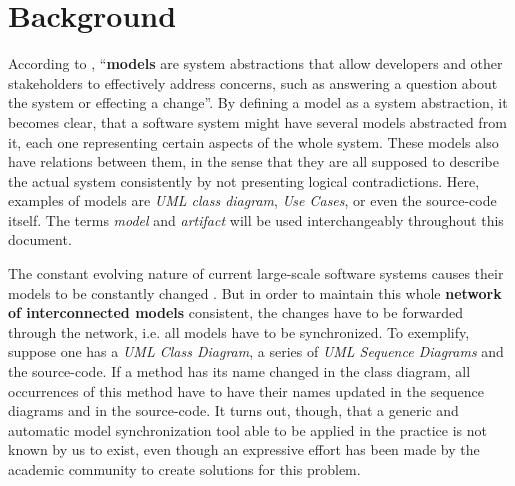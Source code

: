 \documentclass[tuberlin,cic,tc,english,noabntcite, oneside]{iiufrgs}
\begin{document}
\section{Background}
According to \citet[p. 21]{czarnecki2006feature}, \enquote{\textbf{models} are system abstractions that allow developers and other stakeholders to effectively address concerns, such as answering a question about the system or effecting a change}. By defining a model as a system abstraction, it becomes clear, that a software system might have several models abstracted from it, each one representing certain aspects of the whole system. These models also have relations between them, in the sense that they are all supposed to describe the actual system consistently by not presenting logical contradictions. Here, examples of models are \emph{UML class diagram}, \emph{Use Cases}, or even the source-code itself. The terms \emph{model} and \emph{artifact} will be used interchangeably throughout this document.

The constant evolving nature of current large-scale software systems causes their models to be constantly changed \citep{diskin2011model}. But in order to maintain this whole \textbf{network of interconnected models} consistent, the changes have to be forwarded through the network, i.e. all models have to be synchronized. To exemplify, suppose one has a \emph{UML Class Diagram}, a series of \emph{UML Sequence Diagrams} and the source-code. If a method has its name changed in the class diagram, all occurrences of this method have to have their names updated in the sequence diagrams and in the source-code. It turns out, though, that a generic and automatic model synchronization tool able to be applied in the practice is not known by us to exist, even though an expressive effort has been made by the academic community to create solutions for this problem.

\end{document}
